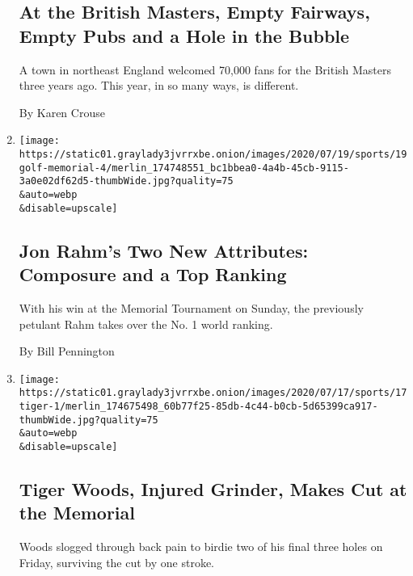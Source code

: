 \begin{enumerate}
  \hypertarget{at-the-british-masters-empty-fairways-empty-pubs-and-a-hole-in-the-bubble}{%
  \subsection{At the British Masters, Empty Fairways, Empty Pubs and a
  Hole in the
  Bubble}\label{at-the-british-masters-empty-fairways-empty-pubs-and-a-hole-in-the-bubble}}

  A town in northeast England welcomed 70,000 fans for the British
  Masters three years ago. This year, in so many ways, is different.

  By Karen Crouse
\item
  \href{/2020/07/19/sports/golf/jon-rahm-penalty-memorial-tournament-score.html}{}

  \texttt{[image: https://static01.graylady3jvrrxbe.onion/images/2020/07/19/sports/19golf-memorial-4/merlin\_174748551\_bc1bbea0-4a4b-45cb-9115-3a0e02df62d5-thumbWide.jpg?quality=75\\\&auto=webp\\\&disable=upscale]}

  \hypertarget{jon-rahms-two-new-attributes-composure-and-a-top-ranking}{%
  \subsection{Jon Rahm's Two New Attributes: Composure and a Top
  Ranking}\label{jon-rahms-two-new-attributes-composure-and-a-top-ranking}}

  With his win at the Memorial Tournament on Sunday, the previously
  petulant Rahm takes over the No. 1 world ranking.

  By Bill Pennington
\item
  \href{/2020/07/17/sports/golf/tiger-woods-memorial-tournament-score.html}{}

  \texttt{[image: https://static01.graylady3jvrrxbe.onion/images/2020/07/17/sports/17tiger-1/merlin\_174675498\_60b77f25-85db-4c44-b0cb-5d65399ca917-thumbWide.jpg?quality=75\\\&auto=webp\\\&disable=upscale]}

  \hypertarget{tiger-woods-injured-grinder-makes-cut-at-the-memorial}{%
  \subsection{Tiger Woods, Injured Grinder, Makes Cut at the
  Memorial}\label{tiger-woods-injured-grinder-makes-cut-at-the-memorial}}

  Woods slogged through back pain to birdie two of his final three holes
  on Friday, surviving the cut by one stroke.


\end{enumerate}
